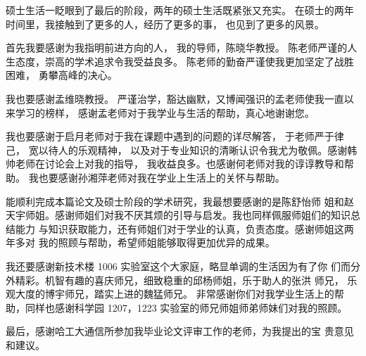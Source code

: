 

硕士生活一眨眼到了最后的阶段，两年的硕士生活既紧张又充实。
在硕士的两年时间里，我接触到了更多的人，经历了更多的事，
也见到了更多的风景。

首先我要感谢为我指明前进方向的人，
我的导师，陈晓华教授。
陈老师严谨的人生态度，崇高的学术追求令我受益良多。
陈老师的勤奋严谨使我更加坚定了战胜困难，
勇攀高峰的决心。

我也要感谢孟维晓教授。
严谨治学，豁达幽默，又博闻强识的孟老师使我一直以来学习的榜样，
感谢孟老师对于我学业与生活的帮助，真心地谢谢您。

我也要感谢于启月老师对于我在课题中遇到的问题的详尽解答，
于老师严于律己，
宽以待人的乐观精神，
以及对于专业知识的清晰认识令我尤为敬佩。感谢韩帅老师在讨论会上对我的指导，
我收益良多。也感谢何老师对我的谆谆教导和帮助。
我也要感谢孙湘萍老师对我在学业上生活上的关怀与帮助。

能顺利完成本篇论文及硕士阶段的学术研究，我最想要感谢的是陈舒怡师
姐和赵天宇师姐。感谢师姐们对我不厌其烦的引导与启发。我也同样佩服师姐们的知识总结能力
与知识获取能力，还有师姐们对于学业的认真，负责态度。感谢师姐这两年多对
我的照顾与帮助，希望师姐能够取得更加优异的成果。

我还要感谢新技术楼 1006 实验室这个大家庭，略显单调的生活因为有了你
们而分外精彩。机智有趣的喜庆师兄，细致稳重的邱杨师姐，乐于助人的张洪
师兄，
乐观大度的博宇师兄，踏实上进的魏猛师兄。
非常感谢你们对我学业生活上的帮助，同样也感谢科学园 1207，1223
实验室的师兄师姐师弟师妹们对我的照顾。

最后，感谢哈工大通信所参加我毕业论文评审工作的老师，为我提出的宝
贵意见和建议。
